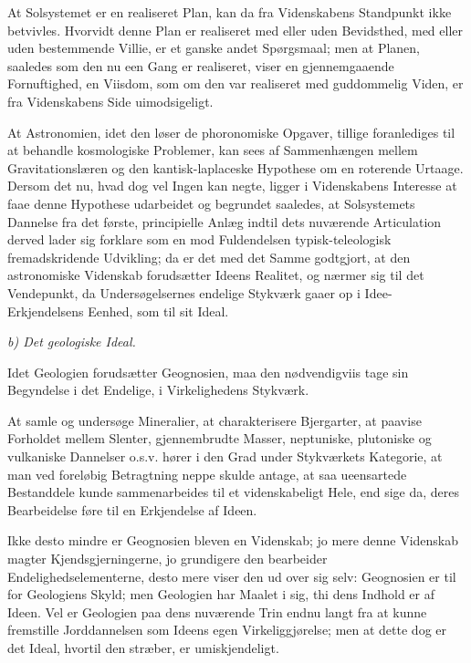 \documentclass[12pt]{book}
\newcommand{\opage}[1]{\marginnote{\footnotesize\textit{[#1]}}}
\begin{document}
At Solsystemet er en realiseret Plan, kan da fra Videnskabens Standpunkt ikke betvivles. Hvorvidt
denne Plan er realiseret med eller uden Bevidsthed, med eller uden bestemmende Villie, er et ganske
andet Spørgsmaal; men at Planen, saaledes som den nu een Gang er realiseret, viser en gjennemgaaende
Fornuftighed, en Viisdom, som om den var realiseret med guddommelig Viden, er fra Videnskabens Side
uimodsigeligt.

At Astronomien, idet den løser de phoronomiske Opgaver, tillige foranlediges til at behandle
kosmologiske Problemer, kan sees af Sammenhængen mellem Gravitationslæren og den kantisk-laplaceske
Hypothese om en roterende Urtaage. Dersom det nu, hvad dog vel Ingen kan negte, ligger i Videnskabens
Interesse at faae denne Hypothese udarbeidet og begrundet saaledes, at Solsystemets Dannelse fra det
første, principielle Anlæg indtil dets nuværende Articulation derved lader sig forklare som en mod
Fuldendelsen typisk-teleologisk fremadskridende Udvikling; da er det med det Samme godtgjort, at den
astronomiske Videnskab
\opage{186} forudsætter Ideens Realitet, og nærmer sig til det Vendepunkt, da Undersøgelsernes endelige Stykværk
gaaer op i Idee-Erkjendelsens Eenhed, som til sit Ideal.

\begin{center}\emph{b) Det geologiske Ideal.}\end{center}

Idet Geologien forudsætter Geognosien, maa den nødvendigviis tage sin Begyndelse i det Endelige, i
Virkelighedens Stykværk.

At samle og undersøge Mineralier, at charakterisere Bjergarter, at paavise Forholdet mellem Slenter,
gjennembrudte Masser, neptuniske, plutoniske og vulkaniske Dannelser o.s.v. hører i den Grad under
Stykværkets Kategorie, at man ved foreløbig Betragtning neppe skulde antage, at saa ueensartede
Bestanddele kunde sammenarbeides til et videnskabeligt Hele, end sige da, deres Bearbeidelse føre til
en Erkjendelse af Ideen.

Ikke desto mindre er Geognosien bleven en Videnskab; jo mere denne Videnskab magter
Kjendsgjerningerne, jo grundigere den bearbeider Endelighedselementerne, desto mere viser den ud over
sig selv: Geognosien er til for Geologiens Skyld; men Geologien har Maalet i sig, thi dens Indhold er
af Ideen. Vel er Geologien paa dens nuværende Trin endnu langt fra at kunne fremstille Jorddannelsen
som Ideens egen Virkeliggjørelse; men at dette dog er det Ideal, hvortil den stræber, er
umiskjendeligt.
\end{document}
